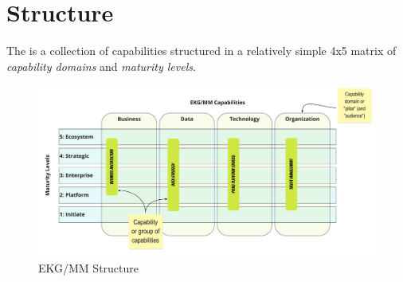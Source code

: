\chapter{Structure}\label{ch:ekg-mm-structure}

The  is a collection of capabilities structured in a relatively simple 4x5 matrix of
\textit{capability domains} and \textit{maturity levels}.

\begin{figure}[ht]
    \centering
    \includegraphics[width=\textwidth]{../images/ekg-mm-structure.pdf}
    \caption{EKG/MM Structure}
    \label{fig:ekg-mm-structure}
\end{figure}












